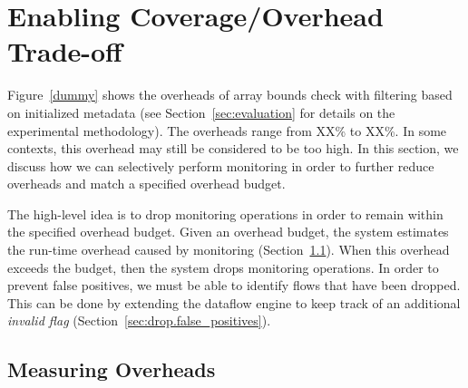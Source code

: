 \section{Enabling Coverage/Overhead Trade-off}
\label{sec:drop}

Figure~\ref{dummy} shows the overheads of array bounds check with filtering
based on initialized metadata (see Section~\ref{sec:evaluation} for details on
the experimental methodology). The overheads range from XX\% to XX\%. In some
contexts, this overhead may still be considered to be too high. In this
section, we discuss how we can selectively perform monitoring in order to
further reduce overheads and match a specified overhead budget.

The high-level idea is to drop monitoring operations in order to remain within
the specified overhead budget. Given an overhead budget, the system estimates
the run-time overhead caused by monitoring (Section~\ref{sec:drop.slack}). When
this overhead exceeds the budget, then the system drops monitoring operations.
In order to prevent false positives, we must be able to identify flows that
have been dropped. This can be done by extending the dataflow engine to keep
track of an additional \emph{invalid flag} (Section~\ref{sec:drop.false_positives}). 

\subsection{Measuring Overheads}
\label{sec:drop.slack}

